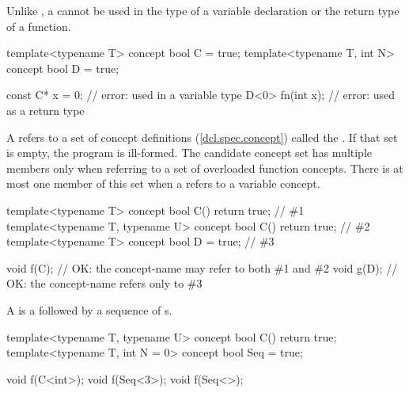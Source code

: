\pnum
\enternote
Unlike , a 
 cannot 
be used in the type of a variable declaration or the return type of
a function.
\begin{codeblock}
template<typename T> concept bool C = true;
template<typename T, int N> concept bool D = true;

const C* x = 0;  // error:  used in a variable type
D<0> fn(int x);  // error:  used as a return type
\end{codeblock}
\exitexample
\exitnote

\pnum
A  refers to a
set of concept definitions (\ref{dcl.spec.concept})
called the .
% 
If that set is empty, the program is ill-formed.
% 
\enternote
The candidate concept set has multiple members
only when referring to a set of overloaded function concepts.
There is at most one member of this set when a 
refers to a variable concept.
\exitnote
% 
\enterexample
\begin{codeblock}
template<typename T> concept bool C() { return true; }             // \#1
template<typename T, typename U> concept bool C() { return true; } // \#2
template<typename T> concept bool D = true;                        // \#3

void f(C); // OK: the concept-name  may refer to both \#1 and \#2
void g(D); // OK: the concept-name  refers only to \#3
\end{codeblock}
\exitexample

\pnum
A  is a
 followed by a
sequence of s.
% 
\enterexample
\begin{codeblock}
template<typename T, typename U> concept bool C() { return true; }
template<typename T, int N = 0> concept bool Seq = true;

void f(C<int>);
void f(Seq<3>);
void f(Seq<>);
\end{codeblock}
\exitexample

